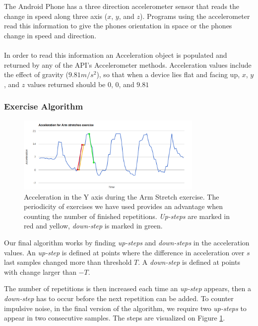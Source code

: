 The Android Phone has a three direction accelerometer sensor that reads the change in speed along three axis ($x$, $y$, and $z$). 
Programs using the accelerometer read this information to give the phones orientation in space or the phones change in speed and direction. 
\\\\
In order to read this information an Acceleration object is populated and returned by any of the API's Accelerometer methods. Acceleration values include the effect of gravity ($9.81 m/s^{2}$), so that when a device lies flat and facing up, $x$, $y$, and $z$ values returned should be $0$, $0$, and $9.81$




\subsubsection{Exercise Algorithm}



\begin{figure}[H]
	\centering
		\includegraphics[width=0.80\textwidth]{images/Armstretch.png}
	\caption{Acceleration in the Y axis during the Arm Stretch exercise. The periodicity of exercises we have used provides an advantage when counting the number of finished repetitions. \textit{Up-steps} are marked in red and yellow, \textit{down-step} is marked in green.}
	\label{fig:acceleration1}
\end{figure}

Our final algorithm works by finding \textit{up-steps} and \textit{down-steps} in the acceleration values. An \textit{up-step} is defined at points where the difference in acceleration over $s$ last samples changed more than threshold $T$. A \textit{down-step} is defined at points with change larger than $-T$. 

The number of repetitions is then increased each time an \textit{up-step} appears, then a \textit{down-step} has to occur before the next repetition can be added. To counter impulsive noise, in the final version of the algorithm, we require two \textit{up-steps} to appear in two consecutive samples. The steps are visualized on Figure \ref{fig:acceleration1}.

